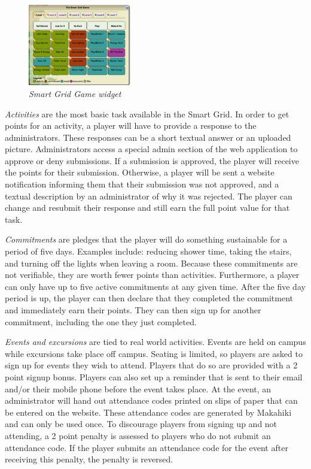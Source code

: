 \begin{figure}[th]
  \center
  \includegraphics[width=0.4\textwidth]{smart-grid.eps}
  \caption{\em \small Smart Grid Game widget}
  \label{fig:SmartGrid}
\end{figure}

{\em Activities} are the most basic task available in the Smart Grid. In order to get points for an activity, a player will have to provide a response to the administrators. These responses can be a short textual answer or an uploaded picture. Administrators access a special admin section of the web application to approve or deny submissions. If a submission is approved, the player will receive the points for their submission. Otherwise, a player will be sent a website notification informing them that their submission was not approved, and a textual description by an administrator of why it was rejected. The player can change and resubmit their response and still earn the full point value for that task.

{\em Commitments} are pledges that the player will do something sustainable for a period of five days. Examples include: reducing shower time, taking the stairs, and turning off the lights when leaving a room. Because these commitments are not verifiable, they are worth fewer points than activities. Furthermore, a player can only have up to five active commitments at any given time. After the five day period is up, the player can then declare that they completed the commitment and immediately earn their points. They can then sign up for another commitment, including the one they just completed.

{\em Events and excursions} are tied to real world activities. Events are held on campus while excursions take place off campus. Seating is limited, so players are asked to sign up for events they wish to attend. Players that do so are provided with a 2 point signup bonus. Players can also set up a reminder that is sent to their email and/or their mobile phone before the event takes place. At the event, an administrator will hand out attendance codes printed on slips of paper that can be entered on the website. These attendance codes are generated by Makahiki and can only be used once. To discourage players from signing up and not attending, a 2 point penalty is assessed to players who do not submit an attendance code. If the player submits an attendance code for the event after receiving this penalty, the penalty is reversed.

